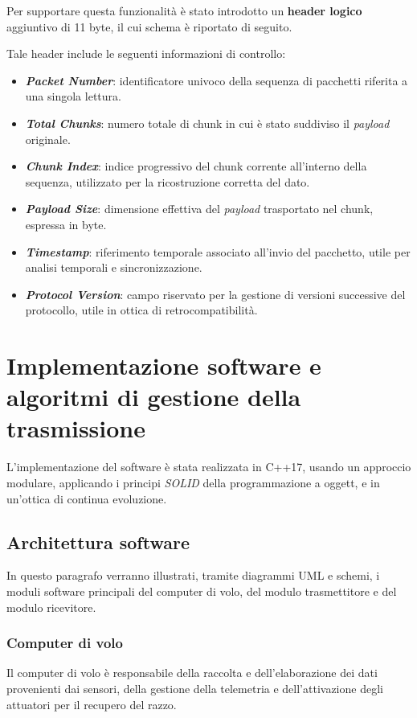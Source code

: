 \documentclass[12pt,a4paper,twoside]{book}
\begin{document}
Per supportare questa funzionalità è stato introdotto un \textbf{header logico}
aggiuntivo di 11 byte, il cui schema è riportato di seguito.\

Tale header include le seguenti informazioni di controllo:

\begin{itemize}
    \item \textbf{\emph{Packet Number}}: identificatore univoco della sequenza di pacchetti riferita a una singola lettura.
    \item \textbf{\emph{Total Chunks}}: numero totale di chunk in cui è stato suddiviso il \emph{payload} originale.
    \item \textbf{\emph{Chunk Index}}: indice progressivo del chunk corrente all'interno della sequenza, utilizzato per la ricostruzione corretta del dato.
    \item \textbf{\emph{Payload Size}}: dimensione effettiva del \emph{payload} trasportato nel chunk, espressa in byte.
    \item \textbf{\emph{Timestamp}}: riferimento temporale associato all’invio del pacchetto, utile per analisi temporali e sincronizzazione.
    \item \textbf{\emph{Protocol Version}}: campo riservato per la gestione di versioni successive del protocollo, utile in ottica di retrocompatibilità.
\end{itemize} 

\section{Implementazione software e algoritmi di gestione della trasmissione}
L'implementazione del software è stata realizzata in C++17, usando un approccio
modulare, applicando i principi \emph{SOLID} della programmazione a oggett, e in
un'ottica di continua evoluzione.

\subsection{Architettura software}
In questo paragrafo verranno illustrati, tramite diagrammi UML e schemi, i moduli software
principali del computer di volo, del modulo trasmettitore e del modulo ricevitore.

\subsubsection{Computer di volo}
Il computer di volo è responsabile della raccolta e dell'elaborazione dei dati
provenienti dai sensori, della gestione della telemetria e dell'attivazione degli
attuatori per il recupero del razzo.
\end{document}
